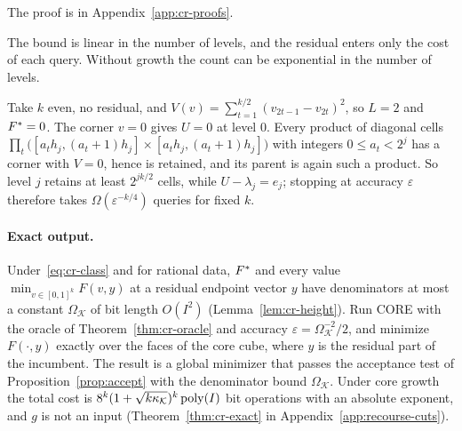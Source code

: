 The proof is in Appendix~\ref{app:cr-proofs}.

The bound is linear in the number of levels, and the residual enters only
the cost of each query. Without growth the count can be exponential in the
number of levels.

\begin{example}\label{ex:cr-flat}
Take $k$ even, no residual, and
$V(v)=\sum_{t=1}^{k/2}(v_{2t-1}-v_{2t})^2$, so $L=2$ and $F^{*}=0$. The corner $v=0$ gives $U=0$ at level $0$. Every product
of diagonal cells
$\prod_t\bigl([a_th_j,(a_t+1)h_j]\times[a_th_j,(a_t+1)h_j]\bigr)$ with
integers $0\le a_t<2^j$ has a
corner with $V=0$, hence is retained, and its parent is again such a
product. So level $j$ retains at least $2^{jk/2}$ cells, while
$U-\lambda_j=e_j$; stopping at accuracy $\varepsilon$ therefore takes
$\Omega(\varepsilon^{-k/4})$ queries for fixed $k$.
\end{example}

\paragraph{Exact output.}
Under~\eqref{eq:cr-class} and for rational data, $F^{*}$ and every value $\min_{v\in[0,1]^k}F(v,y)$ at a
residual endpoint vector $y$ have denominators at most a constant
$\Omega_{\mathcal K}$ of bit length $O(I^2)$ (Lemma~\ref{lem:cr-height}).
Run CORE with the oracle of Theorem~\ref{thm:cr-oracle} and accuracy
$\varepsilon=\Omega_{\mathcal K}^{-2}/2$, and minimize $F(\cdot,y)$
exactly over the faces of the core cube, where $y$ is the residual part of
the incumbent. The result is a global minimizer that passes the acceptance
test of Proposition~\ref{prop:accept} with the denominator bound
$\Omega_{\mathcal K}$. Under core growth the total cost is
$8^k(1+\sqrt{k\kappa_{\mathcal K}})^k\operatorname{poly}(I)$ bit operations with an
absolute exponent, and $g$ is not an input (Theorem~\ref{thm:cr-exact} in
Appendix~\ref{app:recourse-cuts}).
